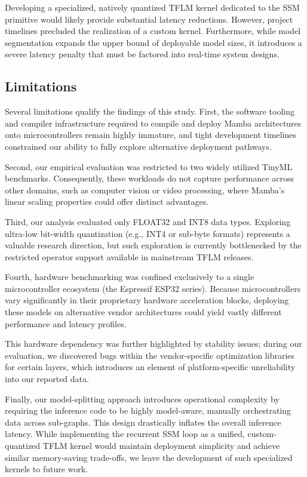 Developing a specialized, natively quantized TFLM kernel dedicated to the SSM primitive would likely provide substantial latency reductions. However, project timelines precluded the realization of a custom kernel. Furthermore, while model segmentation expands the upper bound of deployable model sizes, it introduces a severe latency penalty that must be factored into real-time system designs.

\subsection{Limitations}

Several limitations qualify the findings of this study. First, the software tooling and compiler infrastructure required to compile and deploy Mamba architectures onto microcontrollers remain highly immature, and tight development timelines constrained our ability to fully explore alternative deployment pathways.

Second, our empirical evaluation was restricted to two widely utilized TinyML benchmarks. Consequently, these workloads do not capture performance across other domains, such as computer vision or video processing, where Mamba's linear scaling properties could offer distinct advantages.

Third, our analysis evaluated only FLOAT32 and INT8 data types. Exploring ultra-low bit-width quantization (e.g., INT4 or sub-byte formats) represents a valuable research direction, but such exploration is currently bottlenecked by the restricted operator support available in mainstream TFLM releases.

Fourth, hardware benchmarking was confined exclusively to a single microcontroller ecosystem (the Espressif ESP32 series). Because microcontrollers vary significantly in their proprietary hardware acceleration blocks, deploying these models on alternative vendor architectures could yield vastly different performance and latency profiles.

This hardware dependency was further highlighted by stability issues; during our evaluation, we discovered bugs within the vendor-specific optimization libraries for certain layers, which introduces an element of platform-specific unreliability into our reported data.

Finally, our model-splitting approach introduces operational complexity by requiring the inference code to be highly model-aware, manually orchestrating data across sub-graphs. This design drastically inflates the overall inference latency. While implementing the recurrent SSM loop as a unified, custom-quantized TFLM kernel would maintain deployment simplicity and achieve similar memory-saving trade-offs, we leave the development of such specialized kernels to future work.
